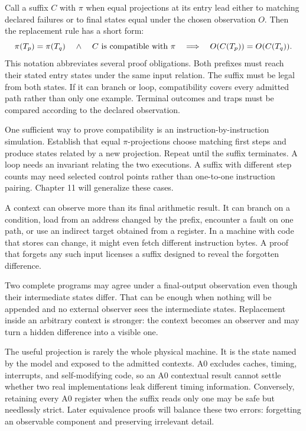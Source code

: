Call a suffix \(C\)  with \(\pi\) when equal
projections at its entry lead either to matching declared failures or to final
states equal under the chosen observation \(O\). Then the replacement rule
has a short form:
\[
 \pi(T_p)=\pi(T_q)
 \quad\mathrel{\land}\quad
 C\ \hbox{is compatible with }\pi
 \quad\Longrightarrow\quad
 O(C(T_p))=O(C(T_q)).
\]
This notation abbreviates several proof obligations. Both prefixes must reach
their stated entry states under the same input relation. The suffix must be
legal from both states. If it can branch or loop, compatibility covers every
admitted path rather than only one example. Terminal outcomes and traps must
be compared according to the declared observation.

One sufficient way to prove compatibility is an instruction-by-instruction
simulation. Establish that equal \(\pi\)-projections choose matching first
steps and produce states related by a new projection. Repeat until the suffix
terminates. A loop needs an invariant relating the two executions. A suffix
with different step counts may need selected control points rather than
one-to-one instruction pairing. Chapter 11 will generalize these cases.

A context can observe more than its final arithmetic result. It can branch on
a condition, load from an address changed by the prefix, encounter a fault on
one path, or use an indirect target obtained from a register. In a machine
with code that stores can change, it might even fetch different instruction bytes. A proof
that forgets any such input licenses a suffix designed to reveal the forgotten
difference.

\begin{sidebar}[title={Closed-program agreement can be weaker}]
Two complete programs may agree under a final-output observation even though
their intermediate states differ. That can be enough when nothing will be
appended and no external observer sees the intermediate states. Replacement
inside an arbitrary context is stronger: the context becomes an observer and
may turn a hidden difference into a visible one.
\end{sidebar}

The useful projection is rarely the whole physical machine. It is the state
named by the model and exposed to the admitted contexts. A0 excludes caches,
timing, interrupts, and self-modifying code, so an A0 contextual result cannot
settle whether two real implementations leak different timing information.
Conversely, retaining every A0 register when the suffix reads only one may be
safe but needlessly strict. Later equivalence proofs will balance these two
errors: forgetting an observable component and preserving irrelevant detail.

